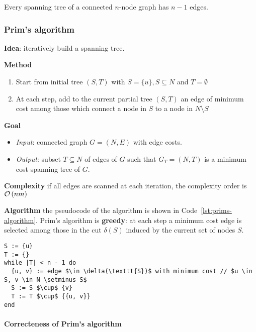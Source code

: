 \documentclass[english]{article}
\begin{document}
\begin{property}
  Every spanning tree of a connected \(n\)-node graph has \(n-1\) edges.
\end{property}

\subsubsection{Prim's algorithm}

\textbf{Idea}: iteratively build a spanning tree.

\bigskip
\textbf{Method}
\begin{enumerate}
  \item Start from initial tree \((S, T)\) with \(S = \{u\}, S \subseteq N\) and \(T = \emptyset\)
  \item At each step, add to the current partial tree \((S, T)\) an edge of minimum cost among those which connect a node in \(S\) to a node in \(N \setminus S\)
\end{enumerate}

\bigskip
\textbf{Goal}
\begin{itemize}[label=\(\rightarrow\)]
  \item \textit{Input}: connected graph \(G = (N, E)\) with edge costs.
  \item \textit{Output}: subset \(T \subseteq N\) of edges of \(G\) such that \(G_T = (N, T)\) is a minimum cost spanning tree of \(G\).
\end{itemize}

\bigskip
\textbf{Complexity}
if all edges are scanned at each iteration, the complexity order is \(\mathcal{O}\left(nm\right)\)

\bigskip
\textbf{Algorithm}
the pseudocode of the algorithm is shown in Code~\ref{lst:prims-algorithm}.
Prim's algorithm is \textbf{greedy}:
at each step a minimum cost edge is selected among those in the cut \(\delta(S)\) induced by the current set of nodes \(S\).

\begin{lstlisting}[caption={Prim's algorithm}, label={lst:prims-algorithm}, float]
S := {u}
T := {}
while |T| < n - 1 do
  {u, v} := edge $\in \delta(\texttt{S})$ with minimum cost // $u \in S, v \in N \setminus S$
  S := S $\cup$ {v}
  T := T $\cup$ {{u, v}}
end
\end{lstlisting}

\paragraph{Correcteness of Prim's algorithm}
\end{document}
